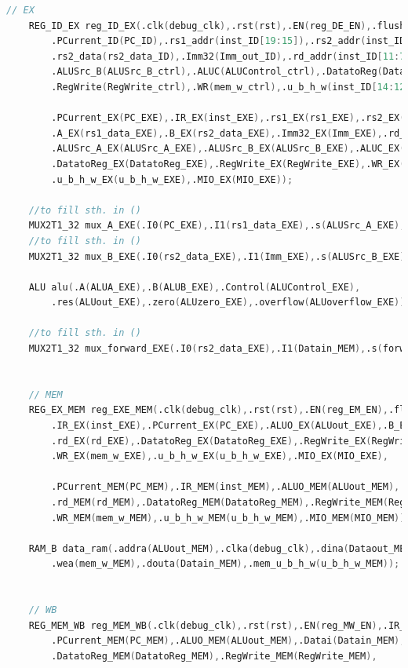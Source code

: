 \begin{lstlisting}[language = {verilog}]
    // EX
    REG_ID_EX reg_ID_EX(.clk(debug_clk),.rst(rst),.EN(reg_DE_EN),.flush(reg_DE_flush),.IR_ID(inst_ID),
        .PCurrent_ID(PC_ID),.rs1_addr(inst_ID[19:15]),.rs2_addr(inst_ID[24:20]),.rs1_data(rs1_data_ID),
        .rs2_data(rs2_data_ID),.Imm32(Imm_out_ID),.rd_addr(inst_ID[11:7]),.ALUSrc_A(ALUSrc_A_ctrl),
        .ALUSrc_B(ALUSrc_B_ctrl),.ALUC(ALUControl_ctrl),.DatatoReg(DatatoReg_ctrl),
        .RegWrite(RegWrite_ctrl),.WR(mem_w_ctrl),.u_b_h_w(inst_ID[14:12]),.MIO(MIO_ctrl),

        .PCurrent_EX(PC_EXE),.IR_EX(inst_EXE),.rs1_EX(rs1_EXE),.rs2_EX(rs2_EXE),
        .A_EX(rs1_data_EXE),.B_EX(rs2_data_EXE),.Imm32_EX(Imm_EXE),.rd_EX(rd_EXE),
        .ALUSrc_A_EX(ALUSrc_A_EXE),.ALUSrc_B_EX(ALUSrc_B_EXE),.ALUC_EX(ALUControl_EXE),
        .DatatoReg_EX(DatatoReg_EXE),.RegWrite_EX(RegWrite_EXE),.WR_EX(mem_w_EXE),
        .u_b_h_w_EX(u_b_h_w_EXE),.MIO_EX(MIO_EXE));
    
    //to fill sth. in ()
    MUX2T1_32 mux_A_EXE(.I0(PC_EXE),.I1(rs1_data_EXE),.s(ALUSrc_A_EXE),.o(ALUA_EXE));  
    //to fill sth. in ()   
    MUX2T1_32 mux_B_EXE(.I0(rs2_data_EXE),.I1(Imm_EXE),.s(ALUSrc_B_EXE),.o(ALUB_EXE));       

    ALU alu(.A(ALUA_EXE),.B(ALUB_EXE),.Control(ALUControl_EXE),
        .res(ALUout_EXE),.zero(ALUzero_EXE),.overflow(ALUoverflow_EXE));
    
    //to fill sth. in ()
    MUX2T1_32 mux_forward_EXE(.I0(rs2_data_EXE),.I1(Datain_MEM),.s(forward_ctrl_ls),.o(Dataout_EXE));        


    // MEM
    REG_EX_MEM reg_EXE_MEM(.clk(debug_clk),.rst(rst),.EN(reg_EM_EN),.flush(reg_EM_flush),
        .IR_EX(inst_EXE),.PCurrent_EX(PC_EXE),.ALUO_EX(ALUout_EXE),.B_EX(Dataout_EXE),
        .rd_EX(rd_EXE),.DatatoReg_EX(DatatoReg_EXE),.RegWrite_EX(RegWrite_EXE),
        .WR_EX(mem_w_EXE),.u_b_h_w_EX(u_b_h_w_EXE),.MIO_EX(MIO_EXE),

        .PCurrent_MEM(PC_MEM),.IR_MEM(inst_MEM),.ALUO_MEM(ALUout_MEM),.Datao_MEM(Dataout_MEM),
        .rd_MEM(rd_MEM),.DatatoReg_MEM(DatatoReg_MEM),.RegWrite_MEM(RegWrite_MEM),
        .WR_MEM(mem_w_MEM),.u_b_h_w_MEM(u_b_h_w_MEM),.MIO_MEM(MIO_MEM));
    
    RAM_B data_ram(.addra(ALUout_MEM),.clka(debug_clk),.dina(Dataout_MEM), 
        .wea(mem_w_MEM),.douta(Datain_MEM),.mem_u_b_h_w(u_b_h_w_MEM));


    // WB
    REG_MEM_WB reg_MEM_WB(.clk(debug_clk),.rst(rst),.EN(reg_MW_EN),.IR_MEM(inst_MEM),
        .PCurrent_MEM(PC_MEM),.ALUO_MEM(ALUout_MEM),.Datai(Datain_MEM),.rd_MEM(rd_MEM),
        .DatatoReg_MEM(DatatoReg_MEM),.RegWrite_MEM(RegWrite_MEM),


\end{lstlisting}
